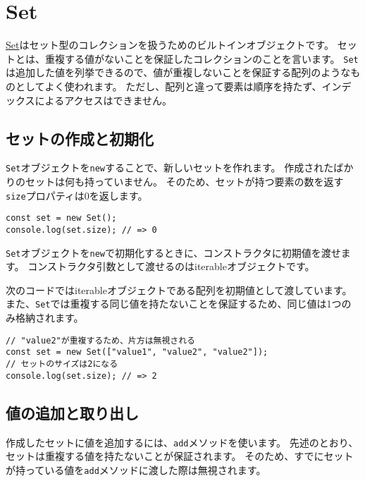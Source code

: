 \hypertarget{set}{%
\section{Set}\label{set}}

\href{https://developer.mozilla.org/ja/docs/Web/JavaScript/Reference/Global_Objects/Set}{Set}はセット型のコレクションを扱うためのビルトインオブジェクトです。
セットとは、重複する値がないことを保証したコレクションのことを言います。
\texttt{Set}は追加した値を列挙できるので、値が重複しないことを保証する配列のようなものとしてよく使われます。
ただし、配列と違って要素は順序を持たず、インデックスによるアクセスはできません。

\hypertarget{set-new}{%
\subsection{セットの作成と初期化}\label{set-new}}

\texttt{Set}オブジェクトを\texttt{new}することで、新しいセットを作れます。
作成されたばかりのセットは何も持っていません。
そのため、セットが持つ要素の数を返す\texttt{size}プロパティは0を返します。

\begin{lstlisting}
const set = new Set();
console.log(set.size); // => 0
\end{lstlisting}

\texttt{Set}オブジェクトを\texttt{new}で初期化するときに、コンストラクタに初期値を渡せます。
コンストラクタ引数として渡せるのはiterableオブジェクトです。

次のコードではiterableオブジェクトである配列を初期値として渡しています。
また、\texttt{Set}では重複する同じ値を持たないことを保証するため、同じ値は1つのみ格納されます。

\begin{lstlisting}
// "value2"が重複するため、片方は無視される
const set = new Set(["value1", "value2", "value2"]);
// セットのサイズは2になる
console.log(set.size); // => 2
\end{lstlisting}

\hypertarget{set-read-and-write}{%
\subsection{値の追加と取り出し}\label{set-read-and-write}}

作成したセットに値を追加するには、\texttt{add}メソッドを使います。
先述のとおり、セットは重複する値を持たないことが保証されます。
そのため、すでにセットが持っている値を\texttt{add}メソッドに渡した際は無視されます。


